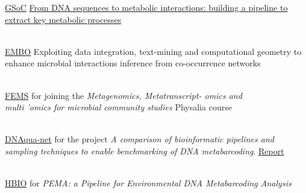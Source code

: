 \documentclass[
	a4paper,
]{fortysecondscv}
\begin{document}
\begin{cvtable}

	{\href{https://summerofcode.withgoogle.com/}{GSoC}}
	{\href{https://summerofcode.withgoogle.com/projects/\#4835597543276544}{From DNA sequences to metabolic interactions: building a pipeline to extract key metabolic processes}}{}

    \\

	{\href{https://www.embo.org/}{EMBO}}
	{Exploiting data integration, text-mining and computational geometry to enhance microbial interactions inference from  co-occurrence networks}{}

    \\

	{\href{https://fems-microbiology.org/}{FEMS}}
	{for joining the \textit{Metagenomics, Metatranscript- omics and \\ 
	multi ’omics for microbial community studies} Physalia course}{}

    \\
    
	{\href{http://dnaqua.net/}{DNAqua-net}}
	{for the project \textit{A comparison of bioinformatic pipelines and sampling techniques to enable benchmarking of DNA metabarcoding}. \href{http://dnaqua.net/wp-content/uploads/2019/08/Zafeiropoulos.pdf}{Report}}{}


    \\
	
	{\href{https://hscbio.wordpress.com/}{HBIO}}
	{for \textit{PEMA: a Pipeline for Environmental DNA Metabarcoding Analysis}}{}
	
\end{cvtable}
\end{document}
